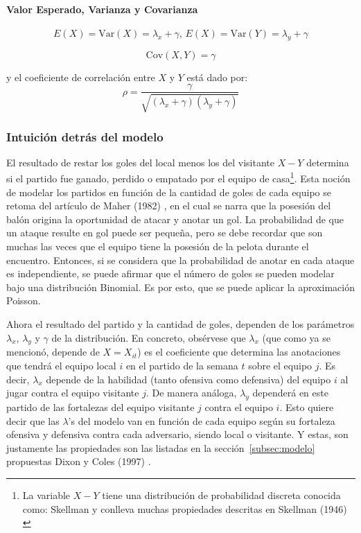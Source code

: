\paragraph{Valor Esperado, Varianza y Covarianza} %
\label{par:valor_esperado}
 \[E(X) = \mathrm{Var}(X) = \lambda_x + \gamma \text{, } E(X) = \mathrm{Var}(Y) = \lambda_y + \gamma\]
 
 \[\mathrm{Cov}(X,Y) = \gamma\]


 y el coeficiente de correlación entre $X$ y $Y$ está dado por:
 \[\rho = \frac{\gamma}{\sqrt{(\lambda_x+\gamma)(\lambda_y+\gamma)}}\]
 




\subsubsection{Intuición detrás del modelo}
\label{subsubsec:intuicion}
 El resultado de restar los goles del local menos los del visitante $X-Y$ determina si el partido fue ganado, perdido o empatado por el equipo de casa\footnote{La variable $X-Y$ tiene una distribución de probabilidad discreta conocida como: Skellman y conlleva muchas propiedades descritas en Skellman (1946) \cite{skellam1946frequency}}. Esta noción de modelar los partidos en función de la cantidad de goles de cada equipo se retoma del artículo de Maher (1982) \cite{maher1982modelling}, en el cual se narra que la posesión del balón origina la oportunidad de atacar y anotar un gol. La probabilidad de que un ataque resulte en gol puede ser pequeña, pero se debe recordar que son muchas las veces que el equipo tiene la posesión de la pelota durante el encuentro. Entonces, si se considera que la probabilidad de anotar en cada ataque es independiente, se puede afirmar que el número de goles se pueden modelar bajo una distribución Binomial. Es por esto, que se puede aplicar la aproximación Poisson.
 
 Ahora el resultado del partido y la cantidad de goles, dependen de los parámetros $\lambda_x$, $\lambda_y$ y $\gamma$ de la distribución. En concreto, obsérvese que $\lambda_x$ (que como ya se mencionó, depende de $X = X_{it}$) es el coeficiente que determina las anotaciones que tendrá el equipo local $i$ en el partido de la semana $t$ sobre el equipo $j$. Es decir, $\lambda_x$ depende de la habilidad (tanto ofensiva como defensiva) del equipo $i$ al jugar contra el equipo visitante $j$. De manera análoga, $\lambda_y$ dependerá en este partido de las fortalezas del equipo visitante $j$ contra el equipo $i$.
 Esto quiere decir que las $\lambda$'s del modelo van en función de cada equipo según su fortaleza ofensiva y defensiva contra cada adversario, siendo local o visitante. Y estas, son justamente las propiedades son las listadas en la sección~\ref{subsec:modelo} propuestas Dixon y Coles (1997) \cite{dixon1997modelling}.
 
